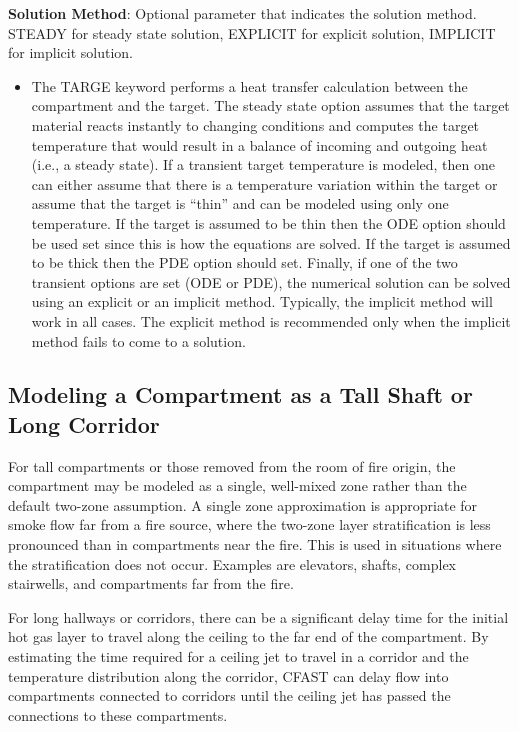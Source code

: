 \textbf{Solution Method}: Optional parameter that indicates the solution method. STEADY for steady state solution, EXPLICIT for explicit solution, IMPLICIT for implicit solution.

\begin{itemize}
\item The TARGE keyword performs a heat transfer calculation between the compartment and the target. The steady state option assumes that the target material reacts instantly to changing conditions and computes the target temperature that would result in a balance of incoming and outgoing heat (i.e., a steady state). If a transient target temperature is modeled, then one can either assume that there is a temperature variation within the target or assume that the target is “thin” and can be modeled using only one temperature. If the target is assumed to be thin then the ODE option should be used set since this is how the equations are solved. If the target is assumed to be thick then the PDE option should set. Finally, if one of the two transient options are set (ODE or PDE), the numerical solution can be solved using an explicit or an implicit method.  Typically, the implicit method will work in all cases.  The explicit method is recommended only when the implicit method fails to come to a solution.

\end{itemize}

\subsection{Modeling a Compartment as a Tall Shaft or Long Corridor}

For tall compartments or those removed from the room of fire origin, the compartment may be modeled as a single, well-mixed zone rather than the default two-zone assumption. A single zone approximation is appropriate for smoke flow far from a fire source, where the two-zone layer stratification is less pronounced than in compartments near the fire. This is used in situations where the stratification does not occur. Examples are elevators, shafts, complex stairwells, and compartments far from the fire.

For long hallways or corridors, there can be a significant delay time for the initial hot gas layer to travel along the ceiling to the far end of the compartment. By estimating the time required for a ceiling jet to travel in a corridor and the temperature distribution along the corridor, CFAST can delay flow into compartments connected to corridors until the ceiling jet has passed the connections to these compartments.

